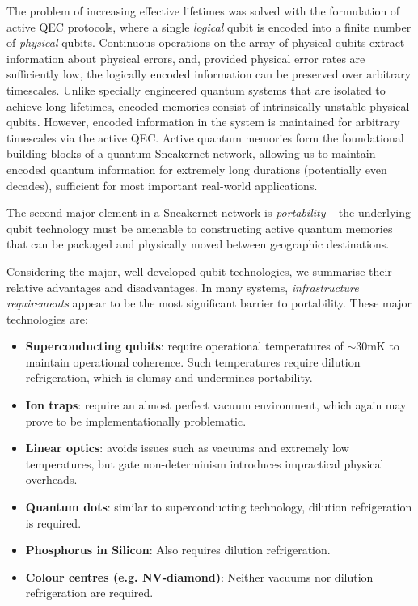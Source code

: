 \documentclass[twocolumn, aps, rmp, amsmath, amssymb, nofootinbib, superscriptaddress, longbibliography, floatfix, table-of-contents, eqsecnum]{revtex4-2}
\begin{document}
The problem of increasing effective lifetimes was solved with the formulation of active QEC protocols, where a single \textit{logical} qubit is encoded into a finite number of \textit{physical} qubits. Continuous operations on the array of physical qubits extract information about physical errors, and, provided physical error rates are sufficiently low, the logically encoded information can be preserved over arbitrary timescales. Unlike specially engineered quantum systems that are isolated to achieve long lifetimes, encoded memories consist of intrinsically unstable physical qubits. However, encoded information in the system is maintained for arbitrary timescales via the active QEC. Active quantum memories form the foundational building blocks of a quantum Sneakernet network, allowing us to maintain encoded quantum information for extremely long durations (potentially even decades), sufficient for most important real-world applications.

The second major element in a Sneakernet network is \textit{portability} -- the underlying qubit technology must be amenable to constructing active quantum memories that can be packaged and physically moved between geographic destinations. 

Considering the major, well-developed qubit technologies, we summarise their relative advantages and disadvantages. In many systems, \textit{infrastructure requirements} appear to be the most significant barrier to portability. These major technologies are:
\begin{itemize}
\item \textbf{Superconducting qubits}: require operational temperatures of $\sim$30mK to maintain operational coherence. Such temperatures require dilution refrigeration, which is clumsy and undermines portability. 
\item \textbf{Ion traps}: require an almost perfect vacuum environment, which again may prove to be implementationally problematic. 
\item \textbf{Linear optics}: avoids issues such as vacuums and extremely low temperatures, but gate non-determinism introduces impractical physical overheads. 
\item \textbf{Quantum dots}: similar to superconducting technology, dilution refrigeration is required.
\item \textbf{Phosphorus in Silicon}: Also requires dilution refrigeration. 
\item \textbf{Colour centres (e.g. NV-diamond)}: Neither vacuums nor dilution refrigeration are required. 
\end{itemize}
\end{document}
